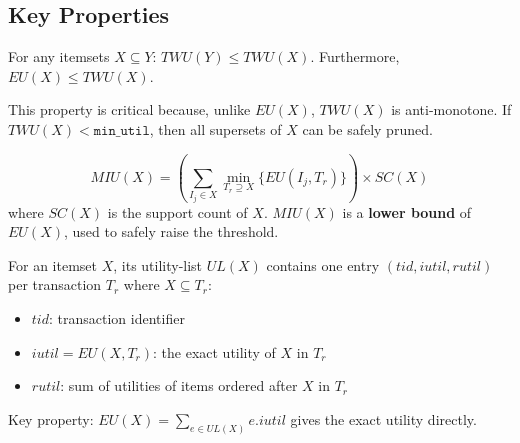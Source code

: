 \subsection{Key Properties}

\begin{theorem}
For any itemsets $X \subseteq Y$: $TWU(Y) \leq TWU(X)$. Furthermore, $EU(X) \leq TWU(X)$.
\end{theorem}

This property is critical because, unlike $EU(X)$, $TWU(X)$ is anti-monotone. If $TWU(X) < \texttt{min\_util}$, then all supersets of $X$ can be safely pruned.

\begin{definition}
\begin{equation}
    MIU(X) = \left(\sum_{I_j \in X} \min_{T_r \supseteq X} \{EU(I_j, T_r)\}\right) \times SC(X)
\end{equation}
where $SC(X)$ is the support count of $X$. $MIU(X)$ is a \textbf{lower bound} of $EU(X)$, used to safely raise the threshold.
\end{definition}

\begin{definition}
For an itemset $X$, its utility-list $UL(X)$ contains one entry $(tid, iutil, rutil)$ per transaction $T_r$ where $X \subseteq T_r$:
\begin{itemize}
    \item $tid$: transaction identifier
    \item $iutil = EU(X, T_r)$: the exact utility of $X$ in $T_r$
    \item $rutil$: sum of utilities of items ordered after $X$ in $T_r$
\end{itemize}
Key property: $EU(X) = \sum_{e \in UL(X)} e.iutil$ gives the exact utility directly.
\end{definition}